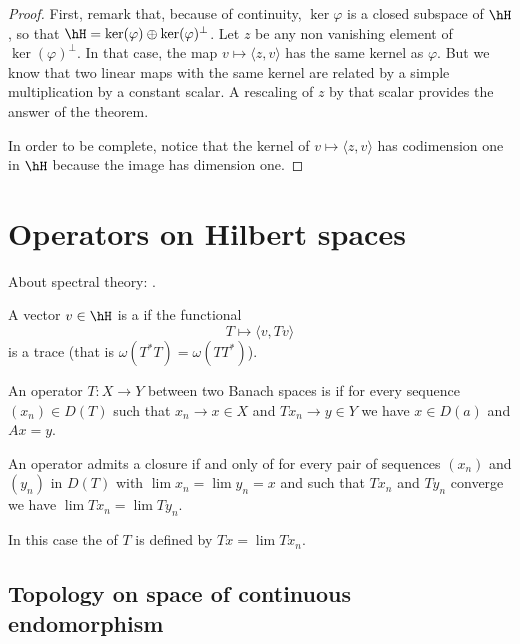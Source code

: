 \begin{proof}
First, remark that, because of continuity, $\ker\varphi$ is a closed subspace of $\hH$, so that $\hH=\ker(\varphi)\oplus\ker(\varphi)^{\perp}$. Let $z$ be any non vanishing element of $\ker(\varphi)^{\perp}$. In that case, the map $v\mapsto\langle z, v\rangle $ has the same kernel as $\varphi$. But we know that two linear maps with the same kernel are related by a simple multiplication by a constant scalar. A rescaling of $z$ by that scalar provides the answer of the theorem.

In order to be complete, notice that the kernel of $v\mapsto\langle z, v\rangle $ has codimension one in $\hH$ because the image has dimension one.
\end{proof}

\section{Operators on Hilbert spaces}
About spectral theory: \cite{AndrewGreen}.

\begin{definition}	\label{DefVecteurTrace}
	A vector $v\in\hH$ is a  if the functional
	\begin{equation}
		T\mapsto\langle v, Tv\rangle 
	\end{equation}
	is a trace (that is $\omega(T^*T)=\omega(TT^*)$).
\end{definition}

\begin{definition}
    An operator \(T\colon X\to Y\) between two Banach spaces is  if for every sequence \( (x_n)\in D(T)\) such that \(x_n\to x\in X\) and \(Tx_n\to y\in Y\) we have \(x\in D(a)\) and \(Ax=y\).
\end{definition}

\begin{proposition}     \label{PropoOpFermableLim}
    An operator admits a closure if and only of for every pair of sequences \( (x_n)\) and \( (y_n)\) in \(D(T)\) with \(\lim x_n=\lim y_n=x\) and such that \(Tx_n\) and \(Ty_n\) converge we have \(\lim Tx_n=\lim Ty_n\).
\end{proposition}

In this case the  of \(T\) is defined by \( Tx=\lim Tx_n \).

\subsection{Topology on space of continuous endomorphism} \label{subsec_topomL}

